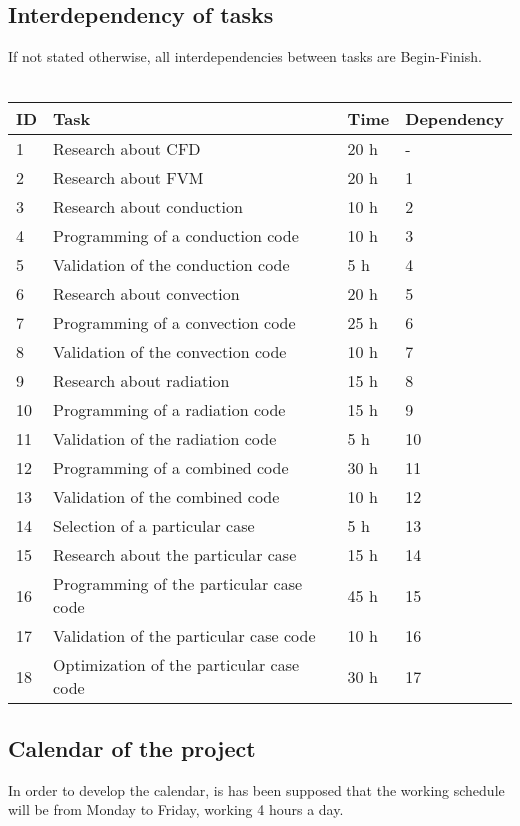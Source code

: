 \subsection{Interdependency of tasks}
If not stated otherwise, all interdependencies between tasks are Begin-Finish.\\
\\
\begin{tabular}{|p{2cm}|p{4cm}|p{2cm}|p{2cm}|}
\hline 
ID & Task & Time & Dependency \\ 
\hline 
1 & Research about CFD & 20 h & - \\ 
\hline 
2 & Research about FVM & 20 h & 1 \\ 
\hline 
3 & Research about conduction & 10 h & 2 \\ 
\hline 
4 & Programming of a conduction code & 10 h & 3 \\ 
\hline 
5 & Validation of the conduction code & 5 h & 4 \\ 
\hline 
6 & Research about convection & 20 h & 5 \\ 
\hline 
7 & Programming of a convection code & 25 h & 6 \\ 
\hline 
8 & Validation of the convection code & 10 h & 7 \\ 
\hline 
9 & Research about radiation & 15 h & 8 \footnotemark \\ 
\hline 
10 & Programming of a radiation code & 15 h & 9 \\ 
\hline 
11 & Validation of the radiation code & 5 h & 10 \\ 
\hline 
12 & Programming of a combined code & 30 h & 11 \\ 
\hline 
13 & Validation of the combined code & 10 h & 12 \\ 
\hline 
14 & Selection of a particular case & 5 h & 13 \\ 
\hline 
15 & Research about the particular case & 15 h & 14 \\ 
\hline 
16 & Programming of the particular case code & 45 h & 15 \\ 
\hline 
17 & Validation of the particular case code & 10 h & 16 \\ 
\hline 
18 & Optimization of the particular case code & 30 h & 17 \\ 
\hline 
\end{tabular} 

\subsection{Calendar of the project}
In order to develop the calendar, is has been supposed that the working schedule will be from Monday to Friday, working 4 hours a day.
\begin{landscape}

\end{landscape}